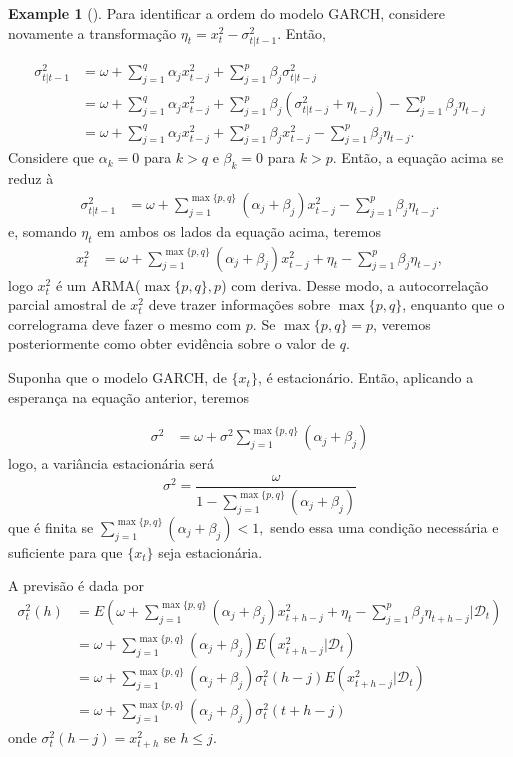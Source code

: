 \documentclass[
  letterpaper,
  DIV=11,
  numbers=noendperiod]{scrartcl}
\theoremstyle{definition}
\newtheorem{example}{Example}[chapter]
\theoremstyle{definition}
\theoremstyle{plain}
\theoremstyle{plain}
\theoremstyle{remark}
\begin{document}
\begin{example}[]
Para identificar a ordem do modelo GARCH, considere novamente a
transformação \(\eta_t=x_t^2 - \sigma^2_{t|t-1}\). Então,

\begin{align}\sigma_{t|t-1}^2&=\omega + \sum_{j=1}^q \alpha_j x_{t-j}^2+ \sum_{j=1}^p \beta_j\sigma^2_{t|t-j}\\
&=\omega + \sum_{j=1}^q \alpha_j x_{t-j}^2+ \sum_{j=1}^p \beta_j(\sigma^2_{t|t-j}+\eta_{t-j})-\sum_{j=1}^p\beta_j\eta_{t-j}\\&=\omega + \sum_{j=1}^q \alpha_j x_{t-j}^2+ \sum_{j=1}^p \beta_jx^2_{t-j}-\sum_{j=1}^p\beta_j\eta_{t-j}.\end{align}
Considere que \(\alpha_k=0\) para \(k>q\) e \(\beta_k=0\) para \(k>p\).
Então, a equação acima se reduz à
\begin{align}\sigma_{t|t-1}^2&=\omega + \sum_{j=1}^{\max\{p,q\}} (\alpha_j +\beta_j)x_{t-j}^2 -\sum_{j=1}^p\beta_j\eta_{t-j}.\end{align}
e, somando \(\eta_t\) em ambos os lados da equação acima, teremos
\begin{align}x_t^2&=\omega + \sum_{j=1}^{\max\{p,q\}} (\alpha_j +\beta_j)x_{t-j}^2 +\eta_t-\sum_{j=1}^p\beta_j\eta_{t-j},\end{align}
logo \(x_t^2\) é um ARMA(\(\max\{p,q\},p\)) com deriva. Desse modo, a
autocorrelação parcial amostral de \(x_t^2\) deve trazer informações
sobre \(\max\{p,q\}\), enquanto que o correlograma deve fazer o mesmo
com \(p\). Se \(\max\{p,q\}=p\), veremos posteriormente como obter
evidência sobre o valor de \(q\).

Suponha que o modelo GARCH, de \(\{x_t\}\), é estacionário. Então,
aplicando a esperança na equação anterior, teremos

\begin{align}\sigma^2&=\omega + \sigma^2\sum_{j=1}^{\max\{p,q\}} (\alpha_j +\beta_j)\end{align}
logo, a variância estacionária será
\[\sigma^2=\frac{\omega}{1-\sum_{j=1}^{\max\{p,q\}}(\alpha_j+\beta_j)}\]
que é finita se \(\sum_{j=1}^{\max\{p,q\}}(\alpha_j+\beta_j)<1,\) sendo
essa uma condição necessária e suficiente para que \(\{x_t\}\) seja
estacionária.

A previsão é dada por
\begin{align}\sigma_t^2(h)&=E\left(\omega + \sum_{j=1}^{\max\{p,q\}} (\alpha_j +\beta_j)x_{t+h-j}^2 +\eta_t-\sum_{j=1}^p\beta_j\eta_{t+h-j}|\mathcal{D}_t\right)\\&=\omega + \sum_{j=1}^{\max\{p,q\}} (\alpha_j +\beta_j)E\left(x_{t+h-j}^2|\mathcal{D}_t\right)\\&=\omega + \sum_{j=1}^{\max\{p,q\}} (\alpha_j +\beta_j)\sigma_{t}^2(h-j)E\left(x_{t+h-j}^2|\mathcal{D}_t\right)\\&=\omega + \sum_{j=1}^{\max\{p,q\}} (\alpha_j +\beta_j)\sigma^2_t(t+h-j)\end{align}
onde \(\sigma^2_{t}(h-j)=x_{t+h}^2\) se \(h\leq j\).


\end{example}
\end{document}
